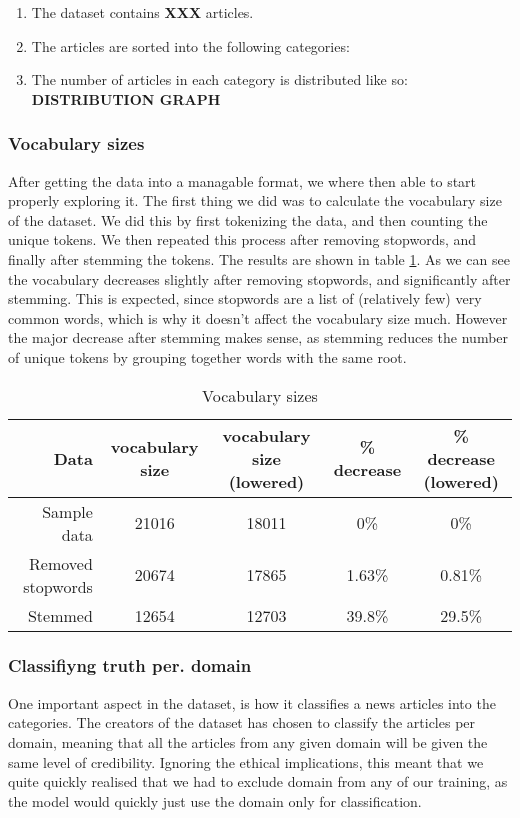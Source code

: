 \begin{enumerate}
  \item The dataset contains \textbf{XXX} articles.
  \item The articles are sorted into the following categories:
  \item The number of articles in each category is distributed like so: \textbf{DISTRIBUTION GRAPH}
\end{enumerate}

\subsubsection{Vocabulary sizes}
After getting the data into a managable format, we where then able to start properly exploring it. The first thing we
did was to calculate the vocabulary size of the dataset. We did this by first tokenizing the data, and then counting the
unique tokens. We then repeated this process after removing stopwords, and finally after stemming the tokens. The
results are shown in table \ref{tab:vocab_sizes}. As we can see the vocabulary decreases slightly after removing
stopwords, and significantly after stemming. This is expected, since stopwords are a list of (relatively few) very
common words, which is why it doesn't affect the vocabulary size much. However the major decrease after stemming makes
sense, as stemming reduces the number of unique tokens by grouping together words with the same root.


\begin{table}[h]
    \centering
    \begin{tabular}{r| c | c | c| c}
      Data& vocabulary size & vocabulary size (lowered) & \% decrease & \% decrease (lowered)\\
        \hline
      Sample data& 21016 & 18011 & 0\% & 0\% \\
    \hline
      Removed stopwords & 20674 & 17865 & 1.63\% & 0.81\% \\
    \hline
      Stemmed & 12654 & 12703 & 39.8\% & 29.5\%
    \end{tabular}
    \caption{Vocabulary sizes}
    \label{tab:vocab_sizes}
\end{table}



\subsubsection{Classifiyng truth per. domain}
One important aspect in the dataset, is how it classifies a news articles into the categories. The creators of the
dataset has chosen to classify the articles per domain, meaning that all the articles from any given domain will be
given the same level of credibility. Ignoring the ethical implications, this meant that we quite quickly realised that
we had to exclude domain from any of our training, as the model would quickly just use the domain only for
classification.
